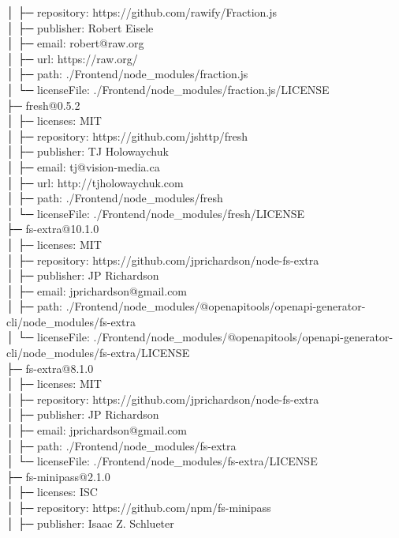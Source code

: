 │  ├─ repository: https://github.com/rawify/Fraction.js\\
│  ├─ publisher: Robert Eisele\\
│  ├─ email: robert@raw.org\\
│  ├─ url: https://raw.org/\\
│  ├─ path: ./Frontend/node\_modules/fraction.js\\
│  └─ licenseFile: ./Frontend/node\_modules/fraction.js/LICENSE\\
├─ fresh@0.5.2\\
│  ├─ licenses: MIT\\
│  ├─ repository: https://github.com/jshttp/fresh\\
│  ├─ publisher: TJ Holowaychuk\\
│  ├─ email: tj@vision-media.ca\\
│  ├─ url: http://tjholowaychuk.com\\
│  ├─ path: ./Frontend/node\_modules/fresh\\
│  └─ licenseFile: ./Frontend/node\_modules/fresh/LICENSE\\
├─ fs-extra@10.1.0\\
│  ├─ licenses: MIT\\
│  ├─ repository: https://github.com/jprichardson/node-fs-extra\\
│  ├─ publisher: JP Richardson\\
│  ├─ email: jprichardson@gmail.com\\
│  ├─ path: ./Frontend/node\_modules/@openapitools/openapi-generator-cli/node\_modules/fs-extra\\
│  └─ licenseFile: ./Frontend/node\_modules/@openapitools/openapi-generator-cli/node\_modules/fs-extra/LICENSE\\
├─ fs-extra@8.1.0\\
│  ├─ licenses: MIT\\
│  ├─ repository: https://github.com/jprichardson/node-fs-extra\\
│  ├─ publisher: JP Richardson\\
│  ├─ email: jprichardson@gmail.com\\
│  ├─ path: ./Frontend/node\_modules/fs-extra\\
│  └─ licenseFile: ./Frontend/node\_modules/fs-extra/LICENSE\\
├─ fs-minipass@2.1.0\\
│  ├─ licenses: ISC\\
│  ├─ repository: https://github.com/npm/fs-minipass\\
│  ├─ publisher: Isaac Z. Schlueter\\
